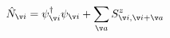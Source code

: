 \begin{equation}
\hat N_{\v i}=
\psi^\dag_{\v i}\psi_{\v i}+\sum_{\v a}
 S^z_{\v i,\v i+\v a}
\end{equation}

